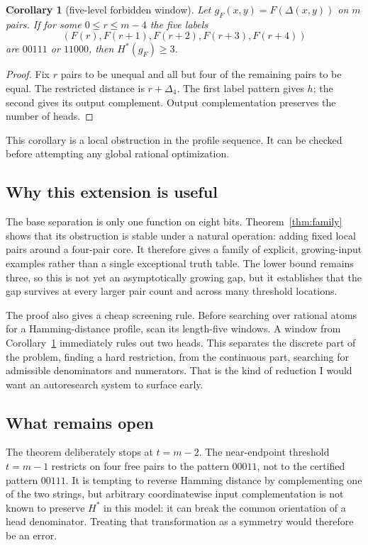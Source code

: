 \documentclass[10pt]{article}
\newtheorem{corollary}[theorem]{Corollary}
\theoremstyle{definition}
\theoremstyle{remark}
\newcommand{\Hstar}{H^{\ast}}
\begin{document}
\begin{corollary}[five-level forbidden window]\label{cor:window}
Let $g_F(x,y)=F(\Delta(x,y))$ on $m$ pairs. If for some $0\leq r\leq m-4$ the
five labels
\[
(F(r),F(r+1),F(r+2),F(r+3),F(r+4))
\]
are $00111$ or $11000$, then $\Hstar(g_F)\geq3$.
\end{corollary}

\begin{proof}
Fix $r$ pairs to be unequal and all but four of the remaining pairs to be equal. The
restricted distance is $r+\Delta_4$. The first label pattern gives $h$; the second gives
its output complement. Output complementation preserves the number of heads.
\end{proof}

This corollary is a local obstruction in the profile sequence. It can be checked before
attempting any global rational optimization.

\subsection{Why this extension is useful}

The base separation is only one function on eight bits. Theorem~\ref{thm:family} shows
that its obstruction is stable under a natural operation: adding fixed local pairs around
a four-pair core. It therefore gives a family of explicit, growing-input examples rather
than a single exceptional truth table. The lower bound remains three, so this is not yet
an asymptotically growing gap, but it establishes that the gap survives at every larger
pair count and across many threshold locations.

The proof also gives a cheap screening rule. Before searching over rational atoms for a
Hamming-distance profile, scan its length-five windows. A window from
Corollary~\ref{cor:window} immediately rules out two heads. This separates the discrete
part of the problem, finding a hard restriction, from the continuous part, searching for
admissible denominators and numerators. That is the kind of reduction I would want an
autoresearch system to surface early.

\subsection{What remains open}

The theorem deliberately stops at $t=m-2$. The near-endpoint threshold $t=m-1$
restricts on four free pairs to the pattern $00011$, not to the certified pattern
$00111$. It is tempting to reverse Hamming distance by complementing one of the two
strings, but arbitrary coordinatewise input complementation is not known to preserve
$\Hstar$ in this model: it can break the common orientation of a head denominator.
Treating that transformation as a symmetry would therefore be an error.
\end{document}
